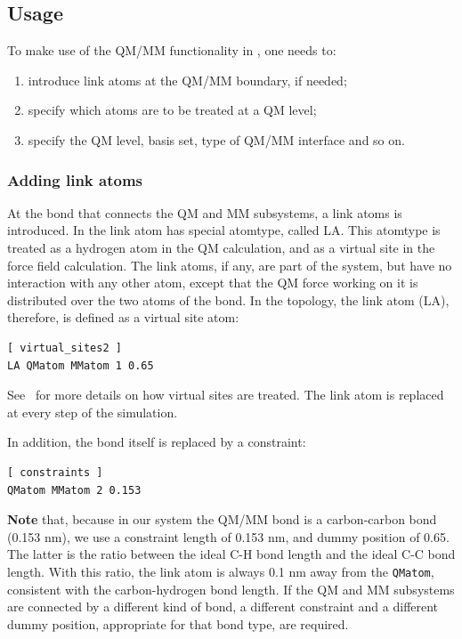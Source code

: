 \subsection{Usage}

To make use of the QM/MM functionality in {\gromacs}, one needs to:

\begin{enumerate}
\item introduce link atoms at the QM/MM boundary, if needed;
\item specify which atoms are to be treated at a QM level;
\item specify the QM level, basis set, type of QM/MM interface and so on. 
\end{enumerate}

\subsubsection{Adding link atoms}

At the bond that connects the QM and MM subsystems, a link atoms is
introduced.  In {\gromacs} the link atom has special atomtype, called
LA. This atomtype is treated as a hydrogen atom in the QM calculation,
and as a virtual site in the force field calculation. The link atoms, if
any, are part of the system, but have no interaction with any other
atom, except that the QM force working on it is distributed over the
two atoms of the bond. In the topology, the link atom (LA), therefore,
is defined as a virtual site atom:

{\small
\begin{verbatim}
[ virtual_sites2 ]
LA QMatom MMatom 1 0.65
\end{verbatim}}

See~ for more details on how virtual sites are
treated. The link atom is replaced at every step of the simulation.

In addition, the bond itself is replaced by a constraint:

{\small
\begin{verbatim}
[ constraints ]
QMatom MMatom 2 0.153
\end{verbatim}}

{\bf Note} that, because in our system the QM/MM bond is a carbon-carbon
bond (0.153 nm), we use a constraint length of 0.153 nm, and dummy
position of 0.65. The latter is the ratio between the ideal C-H
bond length and the ideal C-C bond length. With this ratio, the link
atom is always 0.1 nm away from the {\tt QMatom}, consistent with the
carbon-hydrogen bond length. If the QM and MM subsystems are connected
by a different kind of bond, a different constraint and a different
dummy position, appropriate for that bond type, are required.

